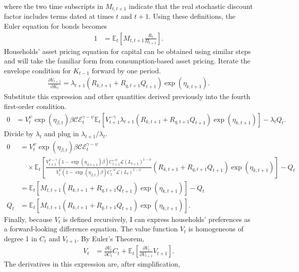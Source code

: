\documentclass[12 pt, oneside]{article}
\theoremstyle{definition}
\theoremstyle{definition}
\theoremstyle{definition}
\newcommand{\E}{\mathbb{E}}
\newcommand{\calC}{\mathcal{C}}
\newcommand{\calE}{\mathcal{E}}
\newcommand{\calL}{\mathcal{L}}
\begin{document}
where the two time subscripts in $M_{t, t + 1}$ indicate that the real stochastic discount factor includes terms dated at times $t$ and $t + 1$.
Using these definitions, the Euler equation for bonds becomes
\begin{align}
  1 & = \E_t\left[M_{t, t + 1}\frac{R_t}{\Pi_{t + 1}}\right].
\end{align}
Households' asset pricing equation for capital can be obtained using similar steps and will take the familiar form from consumption-based asset pricing. Iterate the envelope condition for $K_{t - 1}$ forward by one period.
\begin{align*}
  \frac{\partial V_{t + 1}}{\partial K_t} = \lambda_{t + 1}(R_{k, t + 1} + R_{q, t + 1} Q_{t + 1})\exp(\eta_{k, t + 1}).
\end{align*}
Substitute this expression and other quantities derived previously into the fourth first-order condition.
\begin{align*}
  0 & = V_t^{\psi}\exp(\eta_{\beta, t})\beta \calC\calE_t^{\gamma - \psi}\E_t\left[V_{t + 1}^{-\gamma}\lambda_{t + 1}(R_{k, t + 1} + R_{q, t + 1} Q_{t + 1})\exp(\eta_{k, t + 1})\right] - \lambda_tQ_t.
\end{align*}
Divide by $\lambda_t$ and plug in $\lambda_{t + 1} / \lambda_t$.
\begin{align*}
  0 & = V_t^{\psi}\exp(\eta_{\beta, t})\beta \calC\calE_t^{\gamma - \psi}\\
    &\quad\times\E_t\left[\frac{V_{t + 1}^{\psi - \gamma} (1 - \exp(\eta_{\beta, t + 1})\beta)C_{t + 1}^{-\psi}\calL(L_{t + 1})^{1 - \psi}}{V_t^{\psi}(1 - \exp(\eta_{\beta, t})\beta)C_t^{-\psi} \calL(L_t)^{1 - \psi}}(R_{k, t + 1} + R_{q, t + 1} Q_{t + 1})\exp(\eta_{k, t + 1})\right] - Q_t\\
    & = \E_t\left[M_{t, t + 1}(R_{k, t + 1} + R_{q, t + 1}Q_{t + 1})\exp(\eta_{k, t + 1})\right] - Q_t\\
  Q_t & = \E_t\left[M_{t, t + 1}(R_{k, t + 1} + R_{q, t + 1}Q_{t + 1})\exp(\eta_{k, t + 1})\right].
\end{align*}
Finally, because $V_t$ is defined recursively, I can express households' preferences as a forward-looking difference equation. The value function $V_t$ is homogeneous of degree 1 in $C_t$ and $V_{t + 1}$. By Euler's Theorem,
\begin{align}\label{eq:ez prefs euler theorem}
  V_t & = \frac{\partial V_t}{\partial C_t}C_t + \E_t\left[\frac{\partial V_t}{\partial V_{t + 1}}V_{t + 1}\right].
\end{align}
The derivatives in this expression are, after simplification,
\end{document}
